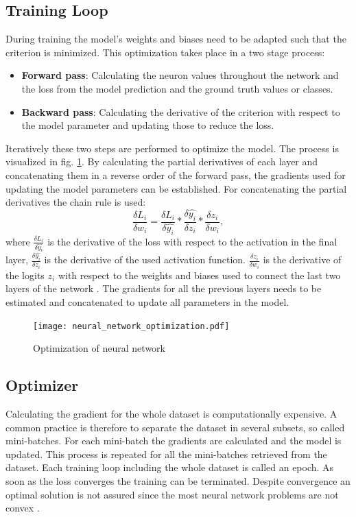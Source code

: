 \subsection{Training Loop}
During training the model's weights and biases need to be adapted such that the criterion is minimized. This optimization takes place in a two stage process:
\begin{itemize}
    \item \textbf{Forward pass}: Calculating the neuron values throughout the network and the loss from the model prediction and the ground truth values or classes.
    \item \textbf{Backward pass}: Calculating the derivative of the criterion with respect to the model parameter and updating those to reduce the loss.
\end{itemize}
Iteratively these two steps are performed to optimize the model. The process is visualized in fig. \ref{fig:neural_network_optimization}. By calculating the partial derivatives of each layer and concatenating them in a reverse order of the forward pass, the gradients used for updating the model parameters can be established. For concatenating the partial derivatives the chain rule is used:
\begin{equation}
 \frac{\delta L_{i}}{\delta w_{i}} = \frac{\delta L_{i}}{\delta \hat{y_{i}}} * \frac{\delta \hat{y_{i}}}{\delta z_{i}} * \frac{\delta z_{i}}{\delta w_{i}}, 
 \label{chain_rule}
\end{equation}
where $\frac{\delta L_{i}}{\delta \hat{y_{i}}}$ is the derivative of the loss with respect to the activation in the final layer, $\frac{\delta \hat{y_{i}}}{\delta z_{i}}$ is the derivative of the used activation function.  $\frac{\delta z_{i}}{\delta w_{i}}$ is the derivative of the logits $z_{i}$ with respect to the weights and biases used to connect the last two layers of the network \cite{ShilohPerl2020}. The gradients for all the previous layers needs to be estimated and concatenated to update all parameters in the model.

\begin{figure}[htpb]
  \centering
  \texttt{[image: neural\_network\_optimization.pdf]}
  \caption {Optimization of neural network}
  \label{fig:neural_network_optimization}
\end{figure}

\subsection{Optimizer}
Calculating the gradient for the whole dataset is computationally expensive. A common practice is therefore to separate the dataset in several subsets, so called mini-batches. For each mini-batch the gradients are calculated and the model is updated. This process is repeated for all the mini-batches retrieved from the dataset. Each training loop including the whole dataset is called an epoch. As soon as the loss converges the training can be terminated. Despite convergence an optimal solution is not assured since the most neural network problems are not convex \cite{ShilohPerl2020}.

